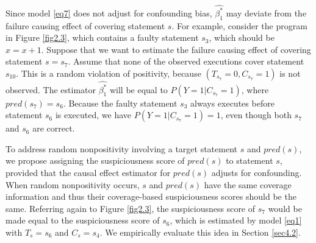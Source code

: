 Since model \eqref{eq7} does not adjust for confounding bias, $\widehat {\beta _1^*}$ may 
deviate from the failure causing effect of covering statement $s$.  For example, consider the program in Figure \ref{fig2.3}, which contains a faulty statement $s_3$, which should be $x=x+1$.  
Suppose that we want to estimate the failure causing effect of covering statement $s=s_7$.  
Assume that none of the observed executions cover statement $s_{10}$.  
This is a random violation of positivity, because $(T_{s_7}=0,C_{s_7}=1)$ is not observed.  
The estimator $\widehat{\beta_1^*}$ will be equal to $P(Y=1|C_{s_7}=1)$, where $pred({s_7})=s_6$.  
Because the faulty statement $s_3$ always executes before statement $s_6$ is executed, 
we have $P(Y=1|C_{{s_7}}=1)=1$, even though both $s_7$ and $s_6$ are correct.

To address random nonpositivity involving a target statement $s$ and $pred(s)$, 
we propose assigning the suspiciousness score of $pred(s)$ to statement $s$, 
provided that the causal effect estimator for $pred(s)$ adjusts for confounding.  
When random nonpositivity occurs, $s$ and $pred(s)$ have the same coverage information 
and thus their coverage-based suspiciousness scores should be the same.  Referring again to Figure \ref{fig2.3}, 
the suspiciousness score of $s_7$ would be made equal to the suspiciousness score of $s_6$, 
which is estimated by model \eqref{eq1} with $T_s=s_6$ and $C_s=s_4$.  
We empirically evaluate this idea in Section \ref{sec4.2}.


